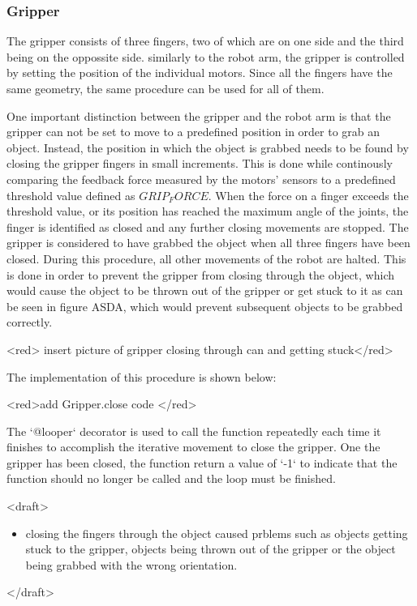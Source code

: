 \subsubsection{Gripper}

The gripper consists of three fingers, two of which are on one side and the third being on the oppossite side. similarly to the robot arm, the gripper is controlled by setting the position of the individual motors. Since all the fingers have the same geometry, the same procedure can be used for all of them. 

One important distinction between the gripper and the robot arm is that the gripper can not be set to move to a predefined position in order to grab an object. Instead, the position in which the object is grabbed needs to be found by closing the gripper fingers in small increments. This is done while continously comparing the feedback force measured by the motors' sensors to a predefined threshold value defined as \(GRIP_FORCE\). When the force on a finger exceeds the threshold value, or its position has reached the maximum angle of the joints, the finger is identified as closed and any further closing movements are stopped. The gripper is considered to have grabbed the object when all three fingers have been closed. During this procedure, all other movements of the robot are halted.
This is done in order to prevent the gripper from closing through the object, which would cause the object to be thrown out of the gripper or get stuck to it as can be seen in figure ASDA, which would prevent subsequent objects to be grabbed correctly.

<red> insert picture of gripper closing through can and getting stuck</red>

The implementation of this procedure is shown below:

<red>add Gripper.close code </red>

The `@looper` decorator is used to call the function repeatedly each time it finishes to accomplish the iterative movement to close the gripper. One the gripper has been closed, the function return a value of `-1` to indicate that the function should no longer be called and the loop must be finished.


<draft>

\begin{itemize}
    \item closing the fingers through the object caused prblems such as objects getting stuck to the gripper, objects being thrown out of the gripper or the object being grabbed with the wrong orientation.
\end{itemize}  
</draft>

